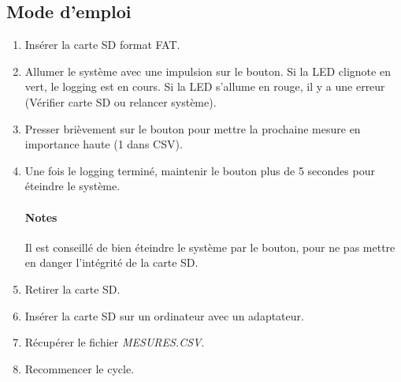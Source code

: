 \documentclass[12pt,a4paper,twoside]{article}
\begin{document}
\subsection{Mode d'emploi}
\begin{enumerate}
	\item Insérer la carte SD format FAT.
	\item Allumer le système avec une impulsion sur le bouton.
	\subitem Si la LED clignote en vert,  le logging est en cours.
	\subitem Si la LED s'allume en rouge, il y a une erreur (Vérifier carte SD ou relancer système).
	\item Presser brièvement sur le bouton pour mettre la prochaine mesure en importance haute (1 dans CSV).
	\item Une fois le logging terminé, maintenir le bouton plus de 5 secondes pour éteindre le système.

\paragraph{Notes} Il est conseillé de bien éteindre le système par le bouton, pour ne pas mettre en danger l'intégrité de la carte SD. \vspace{+5mm}

	\item Retirer la carte SD.
	\item Insérer la carte SD sur un ordinateur avec un adaptateur.
	\item Récupérer le fichier \textit{MESURES.CSV}.
	\item Recommencer le cycle.
\end{enumerate}









\end{document}

